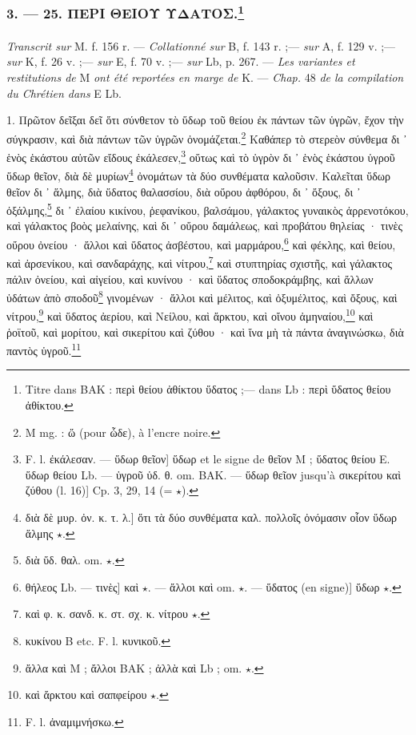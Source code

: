 \documentclass[a4paper, 11pt, oneside, polutonikogreek, french]{article}
\begin{document}
\bigskip
\centerline{\EightStarTaper}
\centerline{\EightStarTaper\EightStarTaper}
\bigskip

\subsubsection[3. --- 25. ΠΕΡΙ ΘΕΙΟΥ ΥΔΑΤΟΣ.]{3. --- 25. ΠΕΡΙ ΘΕΙΟΥ ΥΔΑΤΟΣ.\footnote{Titre dans BAK : περὶ θείου ἀθίκτου ὕδατος ;--- dans Lb : περὶ ὕδατος θείου ἀθίκτου.}}
\paragraph{}
\emph{Transcrit sur} M. f. 156 r. --- \emph{Collationné sur} B, f. 143 r. ;--- \emph{sur} A, f. 129 v. ;--- \emph{sur} K, f. 26 v. ;--- \emph{sur} E, f. 70 v. ;--- \emph{sur} Lb, p. 267. --- \emph{Les variantes et restitutions de} M \emph{ont été reportées en marge de} K. --- \emph{Chap.} 48 \emph{de la compilation du Chrétien dans} E Lb.

\bigskip

1. Πρῶτον δεῖξαι δεῖ ὅτι σύνθετον τὸ ὕδωρ τοῦ θείου ἐκ πάντων τῶν ὑγρῶν, ἔχον τὴν σύγκρασιν, καὶ διὰ πάντων τῶν ὑγρῶν ὀνομάζεται.\footnote{M mg. : ὥ (pour ὧδε), à l'encre noire.} Καθάπερ τὸ στερεὸν σύνθεμα δι ᾽ ἑνὸς ἑκάστου αὐτῶν εἴδους ἐκάλεσεν,\footnote{F. l. ἐκάλεσαν. --- ὕδωρ θεῖον] ὕδωρ et le signe de θεῖον M ; ὕδατος θείου E. ὕδωρ θείου Lb. --- ὑγροῦ ὑδ. θ. om. BAK. --- ὕδωρ θεῖον jusqu'à σικερίτου καὶ ζύθου (l. 16)] Cp. 3, 29, 14 (= $\star$).} οὕτως καὶ τὸ ὑγρὸν δι ᾽ ἑνὸς ἑκάστου ὑγροῦ ὕδωρ θεῖον, διὰ δὲ μυρίων\footnote{διὰ δὲ μυρ. ὀν. κ. τ. λ.] ὅτι τὰ δύο συνθέματα καλ. πολλοῖς ὀνόμασιν οἷον ὕδωρ ἅλμης $\star$.} ὀνομάτων τὰ δύο συνθέματα καλοῦσιν. Καλεῖται ὕδωρ θεῖον δι ᾽ ἅλμης, διὰ ὕδατος θαλασσίου, διὰ οὔρου ἀφθόρου, δι ᾽ ὄξους, δι ᾽ ὀξάλμης,\footnote{διὰ ὕδ. θαλ. om. $\star$.} δι ᾽ ἐλαίου κικίνου, ῥεφανίκου, βαλσάμου, γάλακτος γυναικὸς ἀρρενοτόκου, καὶ γάλακτος βοὸς μελαίνης, καὶ δι ᾽ οὔρου δαμάλεως, καὶ προβάτου θηλείας · τινὲς οὔρου ὀνείου · ἄλλοι καὶ ὕδατος ἀσβέστου, καὶ μαρμάρου,\footnote{θήλεος Lb. --- τινὲς] καὶ $\star$. --- ἄλλοι καὶ om. $\star$. --- ὕδατος (en signe)] ὕδωρ $\star$.} καὶ φέκλης, καὶ θείου, καὶ ἀρσενίκου, καὶ σανδαράχης, καὶ νίτρου,\footnote{καὶ φ. κ. σανδ. κ. στ. σχ. κ. νίτρου $\star$.} καὶ στυπτηρίας σχιστῆς, καὶ γάλακτος πάλιν ὀνείου, καὶ αἰγείου, καὶ κυνίνου · καὶ ὕδατος σποδοκράμβης, καὶ ἄλλων ὑδάτων ἀπὸ σποδοῦ\footnote{κυκίνου B etc. F. l. κυνικοῦ.} γινομένων · ἄλλοι καὶ μέλιτος, καὶ ὀξυμέλιτος, καὶ ὄξους, καὶ νίτρου,\footnote{ἄλλα καὶ M ; ἄλλοι BAK ; ἀλλὰ καὶ Lb ; om. $\star$.} καὶ ὕδατος ἀερίου, καὶ Νείλου, καὶ ἄρκτου, καὶ οἴνου ἀμηναίου,\footnote{καὶ ἄρκτου καὶ σαπφείρου $\star$.} καὶ ῥοϊτοῦ, καὶ μορίτου, καὶ σικερίτου καὶ ζύθου · καὶ ἵνα μὴ τὰ πάντα ἀναγινώσκω, διὰ παντὸς ὑγροῦ.\footnote{F. l. ἀναμιμνήσκω.}
\end{document}
